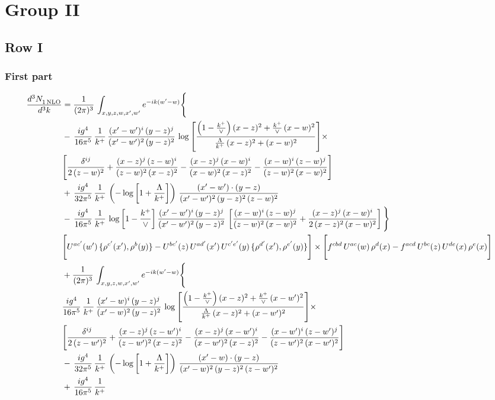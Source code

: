 \documentclass[9pt]{article}
\numberwithin{equation}{section}
\begin{document}
\section{Group II}
\subsection{Row I}
\subsubsection{First part}
\begin{align}
 \frac{d^{3}N_{1\,\rm NLO}^{\rm}}{d^{3}k}  & =    \frac{1}{(2\pi)^{3}}\,\int_{x,y,z,w,x',w^{\prime}} e^{-ik(w^{\prime}-w)}\Bigg\{ \notag \\ & -\, \frac{ig^{4}}{16\pi^{5}}\,\frac{1}{k^{+}}\, \frac{(x'-w')^{i}\,(y-z)^{j}}{(x'-w')^{2}\,(y-z)^{2}}\,\log{\left[\frac{\left(1-\frac{k^{+}}{\vee}\right)(x-z)^{2}+\frac{k^{+}}{\vee}\,(x-w)^{2}}{\frac{\Lambda}{k^{+}}\,(x-z)^{2}+(x-w)^{2}}\right]}\times\notag \\ &  \Bigg[\frac{\delta^{ij}}{2\,(z-w)^{2}}+\frac{(x-z)^{j}\,(z-w)^{i}}{(z-w)^{2}\,(x-z)^{2}}-\frac{(x-z)^{j}\,(x-w)^{i}}{(x-w)^{2}\,(x-z)^{2}}-\frac{(x-w)^{i}\,(z-w)^{j}}{(z-w)^{2}\,(x-w)^{2}}\Bigg]\notag \\ & +\,\frac{ig^{4}}{32\pi^{5}}\,\frac{1}{k^{+}}\,\left(-\log{\left[1+\frac{\Lambda}{k^{+}}\right]}\right)\, \frac{(x'-w')\cdot (y-z)}{(x'-w')^{2}\,(y-z)^{2}\,(z-w)^{2}}\notag \\ & -\, \frac{ig^{4}}{16\pi^{5}}\,\frac{1}{k^{+}}\, \log{\left[1-\frac{k^{+}}{\vee}\right]}\,\frac{(x'-w')^{i}\,(y-z)^{j}}{(x'-w')^{2}\,(y-z)^{2}}\,\left[\frac{(x-w)^{i}\,(z-w)^{j}}{(z-w)^{2}\,(x-w)^{2}}+\frac{(x-z)^{j}\,(x-w)^{i}}{2\,(x-z)^{2}\, (x-w)^{2}}\right]\Bigg\} \notag \\ & \Bigg[U^{ac'}(w')\,\{\rho^{c'}(x'),\rho^{b}(y)\}-U^{bc'}(z)\,U^{ad'}(x')\,U^{c'e'}(y)\, \{\rho^{d'}(x'),\rho^{e'}(y)\}\Bigg]\times \Bigg[f^{cbd}\,U^{ac}(w)\,\rho^{d}(x)-f^{acd}\, U^{bc}(z)\,U^{de}(x)\,\rho^{e}(x)\Bigg]\notag \\ & + \frac{1}{(2\pi)^{3}}\,\int_{x,y,z,w,x',w^{\prime}} e^{-ik(w^{\prime}-w)}\Bigg\{ \notag \\ &  \frac{ig^{4}}{16\pi^{5}}\,\frac{1}{k^{+}}\, \frac{(x'-w)^{i}\,(y-z)^{j}}{(x'-w)^{2}\,(y-z)^{2}}\,\log{\left[\frac{\left(1-\frac{k^{+}}{\vee}\right)(x-z)^{2}+\frac{k^{+}}{\vee}\,(x-w')^{2}}{\frac{\Lambda}{k^{+}}\,(x-z)^{2}+(x-w')^{2}}\right]}\times\notag \\ &  \Bigg[\frac{\delta^{ij}}{2\,(z-w')^{2}}+\frac{(x-z)^{j}\,(z-w')^{i}}{(z-w')^{2}\,(x-z)^{2}}-\frac{(x-z)^{j}\,(x-w')^{i}}{(x-w')^{2}\,(x-z)^{2}}-\frac{(x-w')^{i}\,(z-w')^{j}}{(z-w')^{2}\,(x-w')^{2}}\Bigg]\notag \\ & -\,\frac{ig^{4}}{32\pi^{5}}\,\frac{1}{k^{+}}\,\left(-\log{\left[1+\frac{\Lambda}{k^{+}}\right]}\right)\, \frac{(x'-w)\cdot (y-z)}{(x'-w)^{2}\,(y-z)^{2}\,(z-w')^{2}}\notag \\ & +\,\frac{ig^{4}}{16\pi^{5}}\,\frac{1}{k^{+}}\, 
\end{align}
\end{document}
